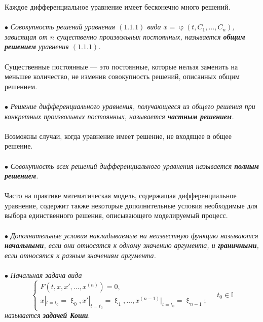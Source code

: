 \documentclass[a4paper, 12pt]{report}
\renewcommand{\varphi}{\upvarphi}
\renewcommand{\xi}{\upxi}
\begin{document}
	Каждое дифференциальное уравнение имеет бесконечно много решений.\\\\
	$\bullet$ \textit{Совокупность решений уравнения $(1.1.1)$ вида $x = \varphi(t, C_1,\dots,C_n)$, зависящая от $n$ существенно произвольных постоянных, называется \textbf{общим решением} уравнения $(1.1.1)$.}\\\\
	Существенные постоянные --- это постоянные, которые нельзя заменить на меньшее количество, не изменив совокупность решений, описанных общим решением.\\\\
	$\bullet$ \textit{Решение дифференциального уравнения, получающееся из общего решения при конкретных произвольных постоянных, называется \textbf{частным решением}.}\\\\
	Возможны случаи, когда уравнение имеет решение, не входящее в общее решение.\\\\
	$\bullet$ \textit{Совокупность всех решений дифференциального уравнения называется \textbf{полным решением}.}\\\\
	Часто на практике математическая модель, содержащая дифференциальное уравнение, содержит также некоторые дополнительные условия необходимые для выбора единственного решения, описывающего моделируемый процесс.\\\\
	$\bullet$ \textit{Дополнительные условия накладываемые на неизвестную функцию называются \textbf{начальными}, если они относятся к одному значению аргумента, и \textbf{граничными}, если относятся к разным значениям аргумента.}\\\\
	$\bullet$ \textit{Начальная задача вида $$\begin{cases} F(t, x, x', \dots, x^{(n)}) = 0,\\ x|_{t = t_0} = \xi_0, x'|_{t = t_0} = \xi_1, \dots, x^{(n-1)}|_{t = t_0} = \xi_{n-1};\end{cases}\quad t_0 \in \mathbb{I}$$ называется \textbf{задачей Коши}}.
\end{document}
